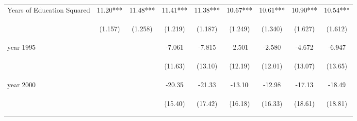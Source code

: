 \begin{table}[htpb!]
\begin{center}
\begin{tabular}{lcccccccc}
Years of Education Squared&11.20***&11.48***&11.41***&11.38***&10.67***&10.61***&10.90***&10.54***\\
&\begin{footnotesize}(1.157)\end{footnotesize}&\begin{footnotesize}(1.258)\end{footnotesize}&\begin{footnotesize}(1.219)\end{footnotesize}&\begin{footnotesize}(1.187)\end{footnotesize}&\begin{footnotesize}(1.249)\end{footnotesize}&\begin{footnotesize}(1.340)\end{footnotesize}&\begin{footnotesize}(1.627)\end{footnotesize}&\begin{footnotesize}(1.612)\end{footnotesize}\\
year 1995&&&-7.061&-7.815&-2.501&-2.580&-4.672&-6.947\\
&&&\begin{footnotesize}(11.63)\end{footnotesize}&\begin{footnotesize}(13.10)\end{footnotesize}&\begin{footnotesize}(12.19)\end{footnotesize}&\begin{footnotesize}(12.01)\end{footnotesize}&\begin{footnotesize}(13.07)\end{footnotesize}&\begin{footnotesize}(13.65)\end{footnotesize}\\
year 2000&&&-20.35&-21.33&-13.10&-12.98&-17.13&-18.49\\
&&&\begin{footnotesize}(15.40)\end{footnotesize}&\begin{footnotesize}(17.42)\end{footnotesize}&\begin{footnotesize}(16.18)\end{footnotesize}&\begin{footnotesize}(16.33)\end{footnotesize}&\begin{footnotesize}(18.61)\end{footnotesize}&\begin{footnotesize}(18.81)\end{footnotesize}\\

\end{tabular}
\end{center}
\end{table}
